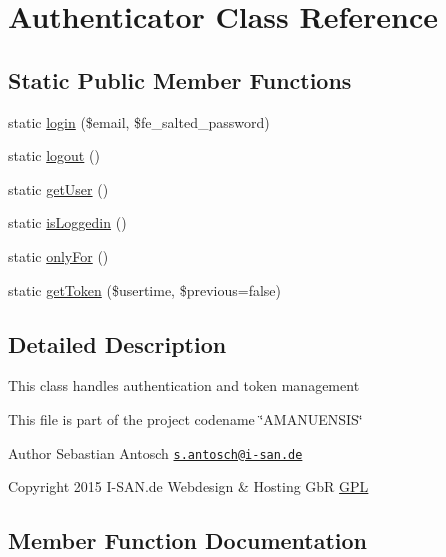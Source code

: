 \hypertarget{a00013}{}\section{Authenticator Class Reference}
\label{a00013}
\subsection*{Static Public Member Functions}
\begin{DoxyCompactItemize}
\item 
static \hyperlink{a00013_a921f34c24bb947352d4f4c86eeac6338}{login} (\$email, \$fe\+\_\+salted\+\_\+password)
\item 
static \hyperlink{a00013_a1e34160e903835a43123f538e93457a2}{logout} ()
\item 
static \hyperlink{a00013_aeeb9b927f96ebe9c88760d70afa39abe}{get\+User} ()
\item 
static \hyperlink{a00013_ac444a5882fe96e442c4f9b9eeb3ea4e0}{is\+Loggedin} ()
\item 
static \hyperlink{a00013_a728b64c20e46e9f21ade1980c6c8406a}{only\+For} ()
\item 
static \hyperlink{a00013_af02a6b16693d143376f591527213412d}{get\+Token} (\$usertime, \$previous=false)
\end{DoxyCompactItemize}


\subsection{Detailed Description}
This class handles authentication and token management

This file is part of the project codename \char`\"{}\+A\+M\+A\+N\+U\+E\+N\+S\+I\+S\char`\"{}

\begin{DoxyAuthor}{Author}
Sebastian Antosch \href{mailto:s.antosch@i-san.de}{\tt s.\+antosch@i-\/san.\+de} 
\end{DoxyAuthor}
\begin{DoxyCopyright}{Copyright}
2015 I-\/\+S\+A\+N.\+de Webdesign \& Hosting Gb\+R \hyperlink{}{G\+P\+L }
\end{DoxyCopyright}


\subsection{Member Function Documentation}
\hypertarget{a00013_a921f34c24bb947352d4f4c86eeac6338}{}
